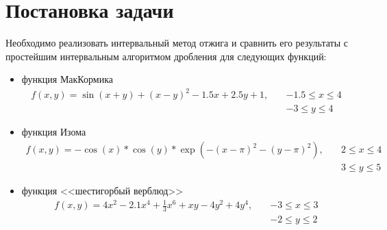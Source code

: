 \section{Постановка задачи}
Необходимо реализовать интервальный метод отжига и сравнить его результаты с простейшим интервальным алгоритмом дробления для следующих функций:
\begin{itemize}
    \item функция МакКормика 
    \begin{equation}\label{McCormick}
\begin{split}
    f(x,y)=\sin(x+y)+(x-y)^2-1.5x+2.5y+1, 
    \quad    &-1.5\leq x \leq 4\\
        &-3\leq y \leq 4
\end{split}
\end{equation}
\item функция Изома
\begin{equation}\label{Easom}
\begin{split}
    f(x,y)=-\cos(x)*\cos(y)*\exp(-(x - \pi)^2-(y - \pi)^2), 
    \quad    &2\leq x \leq 4\\
        &3\leq y \leq 5
\end{split}
\end{equation}
\item функция <<шестигорбый верблюд>> 
\begin{equation}\label{Camel}
\begin{split}
    f(x,y)=4x^2-2.1x^4+\frac{1}{3}x^6+xy-4y^2+4y^4, 
    \quad    &-3\leq x \leq 3\\
        &-2\leq y \leq 2
\end{split}
\end{equation}
\end{itemize}

